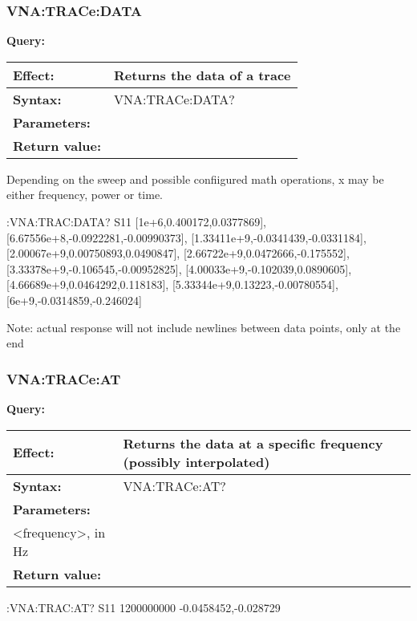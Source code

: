 \documentclass[a4paper,11pt]{article}
\newcommand{\query}[4]{
\noindent\textbf{Query:}
\begin{longtable}{p{.15\textwidth} | p{.80\textwidth} } 
\hline
\textbf{Effect:} & #1 \\ \hline
\textbf{Syntax:} & #2 \\ \hline 
\textbf{Parameters:} & \makecell[tl]{#3} \\ \hline
\textbf{Return value:} & \makecell[tl]{#4} \\ \hline
\end{longtable}
}
\begin{document}
\subsubsection{VNA:TRACe:DATA}
\query{Returns the data of a trace}{VNA:TRACe:DATA?}{<trace>, either by name or by index}{comma-separated list of tuples [x, real(y), imag(y]}
Depending on the sweep and possible confiigured math operations, x may be either frequency, power or time.
\begin{example}
:VNA:TRAC:DATA? S11
[1e+6,0.400172,0.0377869],
[6.67556e+8,-0.0922281,-0.00990373],
[1.33411e+9,-0.0341439,-0.0331184],
[2.00067e+9,0.00750893,0.0490847],
[2.66722e+9,0.0472666,-0.175552],
[3.33378e+9,-0.106545,-0.00952825],
[4.00033e+9,-0.102039,0.0890605],
[4.66689e+9,0.0464292,0.118183],
[5.33344e+9,0.13223,-0.00780554],
[6e+9,-0.0314859,-0.246024]
\end{example}
\vspace{-0.6cm}
\begin{center}
\footnotesize{Note: actual response will not include newlines between data points, only at the end}
\end{center}

\subsubsection{VNA:TRACe:AT}
\query{Returns the data at a specific frequency (possibly interpolated)}{VNA:TRACe:AT?}{<trace>, either by name or by index\\<frequency>, in Hz}{real,imag (or ``NaN,NaN'' if specified frequeny is invalid)}
\begin{example}
:VNA:TRAC:AT? S11 1200000000
-0.0458452,-0.028729
\end{example}
\end{document}
